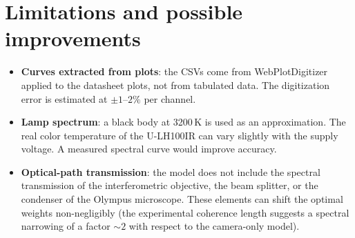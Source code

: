 \documentclass[11pt, a4paper]{article}
\begin{document}
\section{Limitations and possible improvements}

\begin{itemize}
  \item \textbf{Curves extracted from plots}: the CSVs come from
        WebPlotDigitizer applied to the datasheet plots, not from
        tabulated data. The digitization error is estimated at
        $\pm 1$--$2\%$ per channel.

  \item \textbf{Lamp spectrum}: a black body at 3200\,K is used as an
        approximation. The real color temperature of the U-LH100IR can
        vary slightly with the supply voltage. A measured spectral
        curve would improve accuracy.

  \item \textbf{Optical-path transmission}: the model does not include
        the spectral transmission of the interferometric objective, the
        beam splitter, or the condenser of the Olympus microscope.
        These elements can shift the optimal weights non-negligibly
        (the experimental coherence length suggests a spectral
        narrowing of a factor ${\sim}2$ with respect to the
        camera-only model).
\end{itemize}
\end{document}
